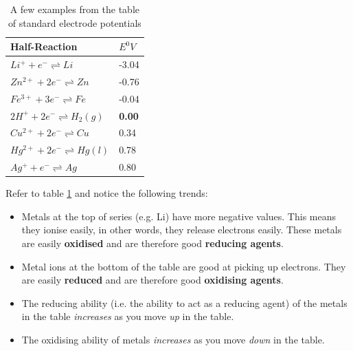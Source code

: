 \begin{table}[h]
\begin{center}
\begin{tabular}{|l|l|}\hline 
\textbf{Half-Reaction}
&
\textbf{$E^{0}V$} \\ \hline\hline
$Li^{+} + e^{-} \rightleftharpoons Li$ & -3.04 \\ \hline
$Zn^{2+} + 2e^{-} \rightleftharpoons Zn $& -0.76 \\ \hline
$Fe^{3+} + 3e^{-} \rightleftharpoons Fe $& -0.04 \\ \hline
$2H^{+} + 2e^{-} \rightleftharpoons H_{2} (g) $& \textbf{0.00} \\ \hline
$Cu^{2+} + 2e^{-} \rightleftharpoons Cu $& 0.34 \\ \hline
$Hg^{2+} + 2e^{-} \rightleftharpoons Hg (l) $& 0.78 \\ \hline
$Ag^{+} + e^{-} \rightleftharpoons Ag $& 0.80 \\ \hline
\end{tabular}
\end{center}
\caption{A few examples from the table of standard electrode potentials}
\label{tab:electrochemical:table sep abbrev}
\end{table}

Refer to table \ref{tab:electrochemical:table sep abbrev} and notice the following trends:

\begin{itemize}
\item{Metals at the top of series (e.g. Li) have more negative values. This means they ionise easily, in other words, they release electrons easily. These metals are easily \textbf{oxidised} and are therefore good \textbf{reducing agents}.}
\item{Metal ions at the bottom of the table are good at picking up electrons. They are easily \textbf{reduced} and are therefore good \textbf{oxidising agents}.}
\item{The reducing ability (i.e. the ability to act as a reducing agent) of the metals in the table \textit{increases} as you move \textit{up} in the table.}
\item{The oxidising ability of metals \textit{increases} as you move \textit{down} in the table.}
\end{itemize}

